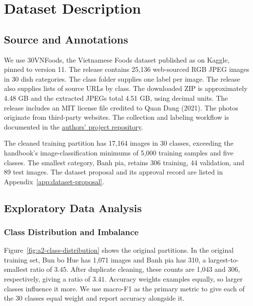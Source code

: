 \section{Dataset Description}
\label{sec:dataset-description}

\subsection{Source and Annotations}

We use 30VNFoods, the Vietnamese Foods dataset published as  on Kaggle, pinned to version 11. The release contains 25,136 web-sourced RGB JPEG images in 30 dish categories. The class folder supplies one label per image. The release also supplies lists of source URLs by class. The downloaded ZIP is approximately 4.48 GB and the extracted JPEGs total 4.51 GB, using decimal units. The release includes an MIT license file credited to Quan Dang (2021). The photos originate from third-party websites. The collection and labeling workflow is documented in the \href{https://github.com/ds4v/30VNFoods}{authors' project repository}.

The cleaned training partition has 17,164 images in 30 classes, exceeding the handbook's image-classification minimums of 5,000 training samples and five classes. The smallest category, Banh pia, retains 306 training, 44 validation, and 89 test images. The dataset proposal and its approval record are listed in Appendix~\ref{app:dataset-proposal}.

\subsection{Exploratory Data Analysis}

\subsubsection{Class Distribution and Imbalance}

Figure~\ref{fig:a2-class-distribution} shows the original partitions. In the original training set, Bun bo Hue has 1,071 images and Banh pia has 310, a largest-to-smallest ratio of $3.45$. After duplicate cleaning, these counts are 1,043 and 306, respectively, giving a ratio of $3.41$. Accuracy weights examples equally, so larger classes influence it more. We use macro-F1 as the primary metric to give each of the 30 classes equal weight and report accuracy alongside it.

